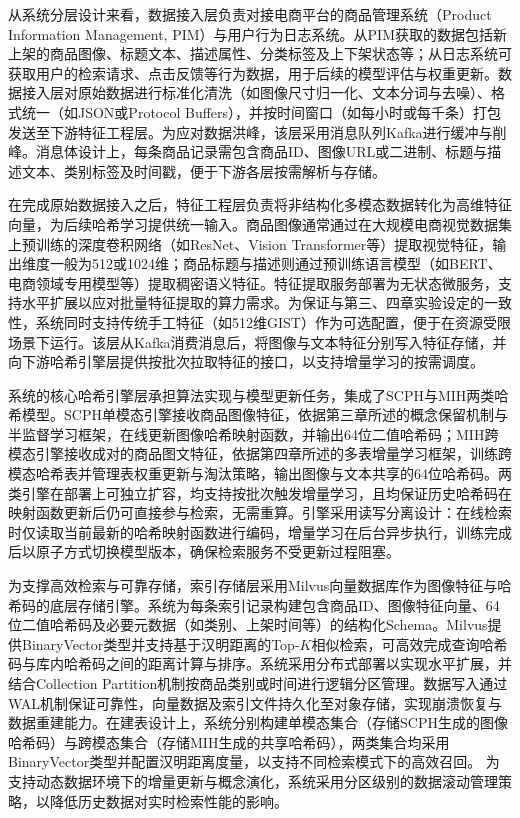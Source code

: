 从系统分层设计来看，数据接入层负责对接电商平台的商品管理系统（Product Information Management, PIM）与用户行为日志系统。从PIM获取的数据包括新上架的商品图像、标题文本、描述属性、分类标签及上下架状态等；从日志系统可获取用户的检索请求、点击反馈等行为数据，用于后续的模型评估与权重更新。数据接入层对原始数据进行标准化清洗（如图像尺寸归一化、文本分词与去噪）、格式统一（如JSON或Protocol Buffers），并按时间窗口（如每小时或每千条）打包发送至下游特征工程层。为应对数据洪峰，该层采用消息队列Kafka进行缓冲与削峰。消息体设计上，每条商品记录需包含商品ID、图像URL或二进制、标题与描述文本、类别标签及时间戳，便于下游各层按需解析与存储。

在完成原始数据接入之后，特征工程层负责将非结构化多模态数据转化为高维特征向量，为后续哈希学习提供统一输入。商品图像通常通过在大规模电商视觉数据集上预训练的深度卷积网络（如ResNet、Vision Transformer等）提取视觉特征，输出维度一般为512或1024维；商品标题与描述则通过预训练语言模型（如BERT、电商领域专用模型等）提取稠密语义特征。特征提取服务部署为无状态微服务，支持水平扩展以应对批量特征提取的算力需求。为保证与第三、四章实验设定的一致性，系统同时支持传统手工特征（如512维GIST）作为可选配置，便于在资源受限场景下运行。该层从Kafka消费消息后，将图像与文本特征分别写入特征存储，并向下游哈希引擎层提供按批次拉取特征的接口，以支持增量学习的按需调度。

系统的核心哈希引擎层承担算法实现与模型更新任务，集成了SCPH与MIH两类哈希模型。SCPH单模态引擎接收商品图像特征，依据第三章所述的概念保留机制与半监督学习框架，在线更新图像哈希映射函数，并输出64位二值哈希码；MIH跨模态引擎接收成对的商品图文特征，依据第四章所述的多表增量学习框架，训练跨模态哈希表并管理表权重更新与淘汰策略，输出图像与文本共享的64位哈希码。两类引擎在部署上可独立扩容，均支持按批次触发增量学习，且均保证历史哈希码在映射函数更新后仍可直接参与检索，无需重算。引擎采用读写分离设计：在线检索时仅读取当前最新的哈希映射函数进行编码，增量学习在后台异步执行，训练完成后以原子方式切换模型版本，确保检索服务不受更新过程阻塞。

为支撑高效检索与可靠存储，索引存储层采用Milvus向量数据库作为图像特征与哈希码的底层存储引擎。系统为每条索引记录构建包含商品ID、图像特征向量、64位二值哈希码及必要元数据（如类别、上架时间等）的结构化Schema。Milvus提供BinaryVector类型并支持基于汉明距离的Top-$K$相似检索，可高效完成查询哈希码与库内哈希码之间的距离计算与排序。系统采用分布式部署以实现水平扩展，并结合Collection Partition机制按商品类别或时间进行逻辑分区管理。数据写入通过WAL机制保证可靠性，向量数据及索引文件持久化至对象存储，实现崩溃恢复与数据重建能力。在建表设计上，系统分别构建单模态集合（存储SCPH生成的图像哈希码）与跨模态集合（存储MIH生成的共享哈希码），两类集合均采用BinaryVector类型并配置汉明距离度量，以支持不同检索模式下的高效召回。
为支持动态数据环境下的增量更新与概念演化，系统采用分区级别的数据滚动管理策略，以降低历史数据对实时检索性能的影响。

